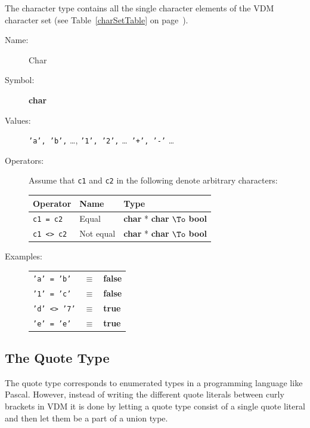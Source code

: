\documentclass{overturerepchap}
\newcommand{\Index}[1]{#1\index{#1}}
\newcommand{\keyw}[1]{{\bf\ttfamily #1}}
\newcommand{\PROD}[2]{#1 * #2}
\newcommand{\TO}[2]{#1 $\To$ #2}
\begin{document}
The character type contains all the single character
elements of the VDM character set
(see Table~\ref{charSetTable} on page~\pageref{charSetTable}).

\begin{description}
\item[Name:] \Index{Char}
\item[Symbol:] \Index{\keyw{char}}
\item[Values:] {\tt 'a', 'b',} \ldots, {\tt '1', '2',} \ldots {\tt
                '+', '-'} \ldots
\item[Operators:] Assume that {\tt c1} and {\tt c2} in the following denote arbitrary
  characters:

  \begin{tabular}{|l|l|l|}\hline
    Operator       & Name      & Type \\ \hline
    {\tt c1 = c2}  & Equal     & \TO{\PROD{\keyw{char}}{\keyw{char}}}{\keyw{bool}} \\
    {\tt c1 <> c2} & Not equal & \TO{\PROD{\keyw{char}}{\keyw{char}}}{\keyw{bool}} \\
    \hline
  \end{tabular}%


\item[Examples:] \mbox{}

  \begin{tabular}{lcl}
    {\tt 'a' = 'b'} &$\equiv$& \keyw{false}\\
    {\tt '1' = 'c'} &$\equiv$& \keyw{false}\\
    {\tt 'd' <> '7'} &$\equiv$& \keyw{true}\\
    {\tt 'e' = 'e'} &$\equiv$& \keyw{true}\\
  \end{tabular}
\end{description}

\subsection{The Quote Type}

The quote type corresponds to enumerated types in a programming
language like Pascal. However, instead of writing the different quote
literals between curly brackets in VDM it is done
by letting a quote type consist of a single quote literal and
then let them be a part of a union type.
\end{document}
